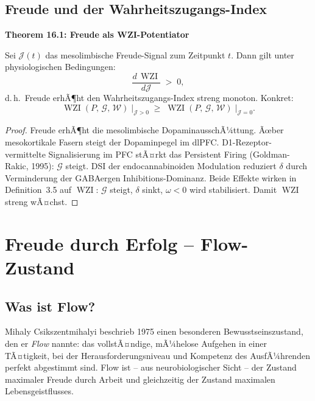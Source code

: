 ﻿\documentclass[12pt,a4paper]{report}
\theoremstyle{plain}
\theoremstyle{definition}
\theoremstyle{remark}
\DeclareMathOperator{\WZI}{WZI}
\begin{document}
	\subsection{Freude und der Wahrheitszugangs-Index}

	
	\noindent\textbf{Theorem 16.1: Freude als WZI-Potentiator}

		Sei $\mathcal{J}(t)$ das mesolimbische Freude-Signal zum Zeitpunkt $t$.
		Dann gilt unter physiologischen Bedingungen:
		\[
		\frac{d\,\WZI}{d\mathcal{J}} \;>\; 0,
		\]
		d.\,h.\ Freude erhÃ¶ht den Wahrheitszugangs-Index streng monoton.
		Konkret:
		\[
		\WZI(P,\,\mathcal{G},\,\mathcal{W})
		\;\big|_{\mathcal{J} > 0}
		\;\geq\;
		\WZI(P,\,\mathcal{G},\,\mathcal{W})
		\;\big|_{\mathcal{J} = 0}.
		\]


	\begin{proof}
		Freude erhÃ¶ht die mesolimbische DopaminausschÃ¼ttung.
		Ãœber mesokortikale Fasern steigt der Dopaminpegel im dlPFC.
		D1-Rezeptor-vermittelte Signalisierung im PFC stÃ¤rkt
		das Persistent Firing (Goldman-Rakic, 1995): $\mathcal{G}$ steigt.
		DSI der endocannabinoiden Modulation reduziert $\delta$
		durch Verminderung der GABAergen Inhibitions-Dominanz.
		Beide Effekte wirken in Definition~3.5 auf $\WZI$:
		$\mathcal{G}$ steigt, $\delta$ sinkt, $\omega < 0$ wird stabilisiert.
		Damit $\WZI$ streng wÃ¤chst. \hfill
	\end{proof}

	\section{Freude durch Erfolg -- Flow-Zustand}

	\subsection{Was ist Flow?}

	Mihaly Csikszentmihalyi beschrieb 1975 einen besonderen
	Bewusstseinszustand, den er \emph{Flow} nannte: das vollstÃ¤ndige,
	mÃ¼helose Aufgehen in einer TÃ¤tigkeit, bei der Herausforderungsniveau
	und Kompetenz des AusfÃ¼hrenden perfekt abgestimmt sind.
	Flow ist -- aus neurobiologischer Sicht -- der Zustand maximaler
	Freude durch Arbeit und gleichzeitig der Zustand maximalen
	Lebensgeistflusses.
\end{document}
